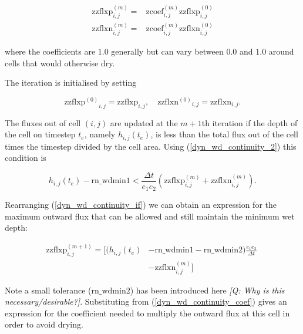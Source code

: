 \begin{equation} \label{dyn_wd_continuity_coef}
\begin{split}
\mathrm{zzflxp}^{(m)}_{i,j} =& \mathrm{zcoef}_{i,j}^{(m)} \mathrm{zzflxp}^{(0)}_{i,j} \\
\mathrm{zzflxn}^{(m)}_{i,j} =& \mathrm{zcoef}_{i,j}^{(m)} \mathrm{zzflxn}^{(0)}_{i,j}
\end{split}
\end{equation} 
 
where the coefficients are $1.0$ generally but can vary between $0.0$ and $1.0$ around
cells that would otherwise dry.

The iteration is initialised by setting

\begin{equation} \label{dyn_wd_zzflx_initial}
\mathrm{zzflxp^{(0)}}_{i,j} = \mathrm{zzflxp}_{i,j} , \quad  \mathrm{zzflxn^{(0)}}_{i,j} = \mathrm{zzflxn}_{i,j} . 
\end{equation} 

The fluxes out of cell $(i,j)$ are updated at the $m+1$th iteration if the depth of the
cell on timestep $t_e$, namely $h_{i,j}(t_e)$, is less than the total flux out of the cell
times the timestep divided by the cell area. Using (\ref{dyn_wd_continuity_2}) this
condition is

\begin{equation} \label{dyn_wd_continuity_if}
h_{i,j}(t_e)  - \mathrm{rn\_wdmin1} <  \frac{\Delta t}{e_1 e_2} ( \mathrm{zzflxp}^{(m)}_{i,j} + \mathrm{zzflxn}^{(m)}_{i,j} ) .
\end{equation} 

Rearranging (\ref{dyn_wd_continuity_if}) we can obtain an expression for the maximum
outward flux that can be allowed and still maintain the minimum wet depth:

\begin{equation} \label{dyn_wd_max_flux}
\begin{split}
\mathrm{zzflxp}^{(m+1)}_{i,j} = \Big[ (h_{i,j}(t_e) & - \mathrm{rn\_wdmin1} - \mathrm{rn\_wdmin2})  \frac{e_1 e_2}{\Delta t} \phantom{]} \\
\phantom{[} & -  \mathrm{zzflxn}^{(m)}_{i,j} \Big]
\end{split}
\end{equation}

Note a small tolerance ($\mathrm{rn\_wdmin2}$) has been introduced here {\it [Q: Why is
this necessary/desirable?]}. Substituting from (\ref{dyn_wd_continuity_coef}) gives an
expression for the coefficient needed to multiply the outward flux at this cell in order
to avoid drying. 

